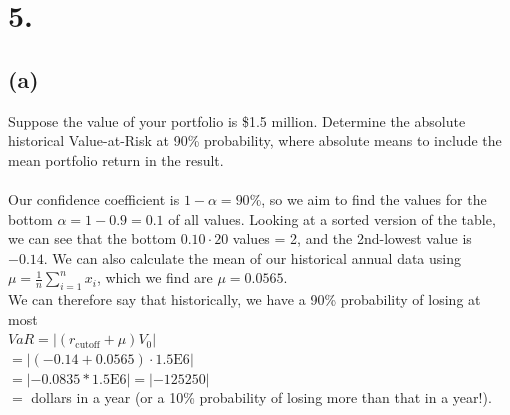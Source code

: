\documentclass{article}
\begin{document}
\section*{5.}
{\Large 

\subsection*{(a)}

Suppose the value of your portfolio is \$1.5 million. Determine the absolute historical Value-at-Risk at 90\% probability, where absolute means to include the mean portfolio return in the result. \\ \\


Our confidence coefficient is $1 - \alpha = 90\%$, so we aim to find the values for the bottom $\alpha = 1 - 0.9 = 0.1$ of all values. Looking at a sorted version of the table, we can see that the bottom $0.10 \cdot 20$ values = 2, and the 2nd-lowest value is $-0.14$. We can also calculate the mean of our historical annual data using $\mu = \frac{1}{n} \sum_{i=1}^{n} x_i$, which we find are $\mu = 0.0565$. \\
We can therefore say that historically, we have a 90\% probability of losing at most \\
$VaR = |(r_\text{cutoff} + \mu)V_0|$ \\
$= |(-0.14 + 0.0565) \cdot 1.5\text{E6}|$ \\
$= |-0.0835 * 1.5\text{E6}| = |-125250|$ \\
$= $  dollars in a year (or a 10\% probability of losing more than that in a year!).

}
\end{document}
